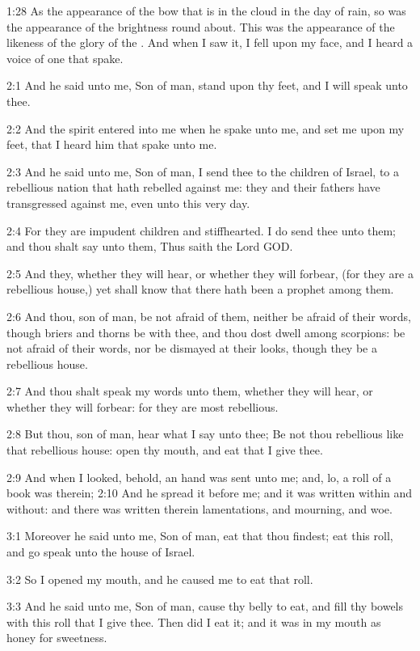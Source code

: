 1:28 As the appearance of the bow that is in the cloud in the day of
rain, so was the appearance of the brightness round about. This was
the appearance of the likeness of the glory of the \LORD. And when I
saw it, I fell upon my face, and I heard a voice of one that spake.

2:1 And he said unto me, Son of man, stand upon thy feet, and I will
speak unto thee.

2:2 And the spirit entered into me when he spake unto me, and set me
upon my feet, that I heard him that spake unto me.

2:3 And he said unto me, Son of man, I send thee to the children of
Israel, to a rebellious nation that hath rebelled against me: they and
their fathers have transgressed against me, even unto this very day.

2:4 For they are impudent children and stiffhearted. I do send thee
unto them; and thou shalt say unto them, Thus saith the Lord GOD.

2:5 And they, whether they will hear, or whether they will forbear,
(for they are a rebellious house,) yet shall know that there hath been
a prophet among them.

2:6 And thou, son of man, be not afraid of them, neither be afraid of
their words, though briers and thorns be with thee, and thou dost
dwell among scorpions: be not afraid of their words, nor be dismayed
at their looks, though they be a rebellious house.

2:7 And thou shalt speak my words unto them, whether they will hear,
or whether they will forbear: for they are most rebellious.

2:8 But thou, son of man, hear what I say unto thee; Be not thou
rebellious like that rebellious house: open thy mouth, and eat that I
give thee.

2:9 And when I looked, behold, an hand was sent unto me; and, lo, a
roll of a book was therein; 2:10 And he spread it before me; and it
was written within and without: and there was written therein
lamentations, and mourning, and woe.

3:1 Moreover he said unto me, Son of man, eat that thou findest; eat
this roll, and go speak unto the house of Israel.

3:2 So I opened my mouth, and he caused me to eat that roll.

3:3 And he said unto me, Son of man, cause thy belly to eat, and fill
thy bowels with this roll that I give thee. Then did I eat it; and it
was in my mouth as honey for sweetness.

